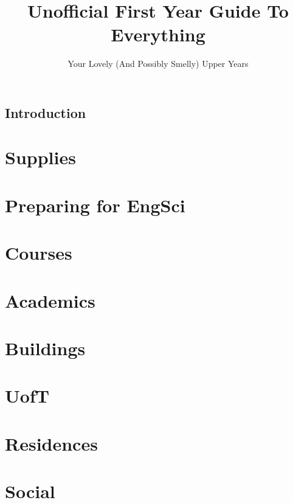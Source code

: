 \documentclass[12pt]{report}
\author{Your Lovely (And Possibly Smelly) Upper Years}
\title{Unofficial First Year Guide To Everything}
\begin{document}
\maketitle
\tableofcontents

\section{Introduction}

\chapter{Supplies}


\chapter{Preparing for EngSci}


\chapter{Courses}


\chapter{Academics}


\chapter{Buildings}


\chapter{UofT}


\chapter{Residences}


\chapter{Social}

\end{document}
